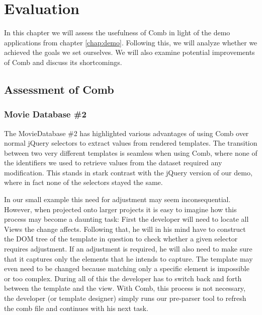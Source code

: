 \documentclass[thesis.tex]{subfiles}
\begin{document}
\chapter{Evaluation}
\label{chap:evaluation}


In this chapter we will assess the usefulness of Comb in light of the
demo applications from chapter \ref{chap:demo}.
Following this, we will analyze whether we achieved the goals we set ourselves.
We will also examine potential improvements of Comb and discuss its
shortcomings.




\section{Assessment of Comb}
\label{sec:assessment}

\subsection{Movie Database \#2}
\label{sec:asses-mdb}
The MovieDatabase \#2 has highlighted various advantages of using Comb over
normal jQuery selectors to extract values from rendered templates.
The transition between two very different templates is seamless when using Comb,
where none of the identifiers we used to retrieve values from the dataset
required any modification. This stands in stark contrast with the jQuery version
of our demo, where in fact none of the selectors stayed the same.

In our small example this need for adjustment may seem inconsequential.
However, when projected onto larger projects it is easy to imagine how this
process may become a daunting task: First the developer will need to locate all
Views the change affects. Following that, he will in his mind have to construct
the DOM tree of the template in question to check whether a given selector
requires adjustment.
If an adjustment is required, he will also need to make sure that
it captures only the elements that he intends to capture.
The template may even need to be changed because matching only a specific
element is impossible or too complex.
During all of this the developer has to switch back and forth between
the template and the view. With Comb, this process is not necessary, the
developer (or template designer) simply runs our pre-parser tool to refresh the
comb file and continues with his next task.
\end{document}
